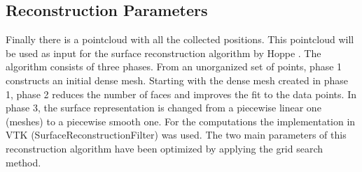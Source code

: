 \subsection{Reconstruction Parameters}
Finally there is a pointcloud with all the collected positions. This pointcloud
will be used as input for the surface reconstruction algorithm by Hoppe
\cite{hoppe1992surface}. The algorithm consists
of three phases. From an unorganized set of points, phase 1 constructs an
initial dense mesh. Starting with the dense mesh created in phase 1, phase 2
reduces the number of faces and improves the fit to the data points. In phase 3,
the surface representation is changed from a piecewise linear one (meshes) to a
piecewise smooth one. For the computations the implementation in VTK
(SurfaceReconstructionFilter) was used. The two main parameters of this
reconstruction algorithm have been optimized by applying the grid search method.
